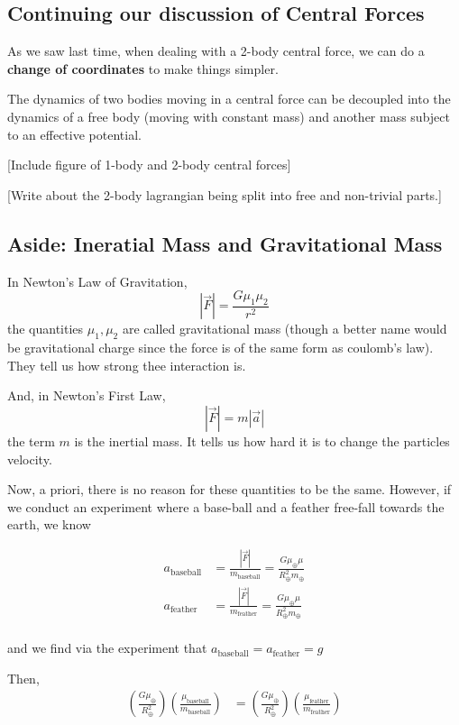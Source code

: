 \documentclass[11pt]{article}
\begin{document}
\subsection{Continuing our discussion of Central Forces}

As we saw last time, when dealing with a 2-body central force, we can do a \textbf{change of coordinates} to make things simpler.

\vskip 0.5cm
The dynamics of two bodies moving in a central force can be decoupled into the dynamics of a free body (moving with constant mass) and another mass subject to an effective potential.

\vskip 0.5cm
[Include figure of 1-body and 2-body central forces] 

[Write about the 2-body lagrangian being split into free and non-trivial parts.]

\vskip 0.5cm
\subsection{Aside: Ineratial Mass and Gravitational Mass}

In Newton's Law of Gravitation,
\[ |\vec{F}| = \frac{G \mu_1 \mu_2}{r^2} \]
the quantities $\mu_1, \mu_2$ are called gravitational mass (though a better name would be gravitational charge since the force is of the same form as coulomb's law). They tell us how strong thee interaction is.

\vskip 0.5cm
And, in Newton's First Law,
\[ |\vec{F}| = m|\vec{a}| \]
the term $m$ is the inertial mass. It tells us how hard it is to change the particles velocity.

\vskip 0.5cm
Now, a priori, there is no reason for these quantities to be the same. However, if we conduct an experiment where a base-ball and a feather free-fall towards the earth, we know

\begin{align*}
  a_{\text{baseball}} &= \frac{|\vec{F}|}{m_{\text{baseball}}} = \frac{G \mu_{\oplus} \mu}{R_{\oplus}^2 m_{\oplus}} \\
  a_{\text{feather}} &= \frac{|\vec{F}|}{m_{\text{feather}}} = \frac{G \mu_{\oplus} \mu}{R_{\oplus}^2 m_{\oplus}} \\
\end{align*}

and we find via the experiment that $a_{\text{baseball}} = a_{\text{feather}} = g$

Then, 
\begin{align*}
  \left( \frac{G \mu_{\oplus}}{R_{\oplus}^2} \right) \left(\frac{\mu_{\text{baseball}}}{m_{\text{baseball}}}\right) &= \left( \frac{G \mu_{\oplus}}{R_{\oplus}^2} \right) \left(\frac{\mu_{\text{feather}}}{m_{\text{feather}}}\right)
\end{align*}
\end{document}
